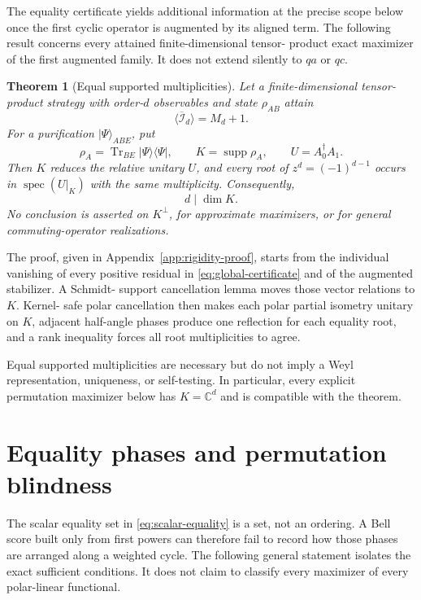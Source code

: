 \documentclass[11pt]{article}
\newtheorem{theorem}{Theorem}[section]
\theoremstyle{definition}
\theoremstyle{remark}
\newcommand{\cI}{\mathcal I}
\newcommand{\Tr}{\operatorname{Tr}}
\newcommand{\supp}{\operatorname{supp}}
\newcommand{\spec}{\operatorname{spec}}
\newcommand{\bbC}{\mathbb C}
\begin{document}
The equality certificate yields additional information at the precise scope
below once the first cyclic operator is augmented by its aligned term.
The following result concerns every attained finite-dimensional tensor-
product exact maximizer of the first augmented family.  It does not extend
silently to \(qa\) or \(qc\).

\begin{theorem}[Equal supported multiplicities]
\label{thm:support-rigidity}
Let a finite-dimensional tensor-product strategy with order-\(d\)
observables and state \(\rho_{AB}\) attain
\[
 \langle\overline{\cI}_d\rangle=M_d+1.
\]
For a purification \(\lvert\Psi\rangle_{ABE}\), put
\[
 \rho_A=\Tr_{BE}\lvert\Psi\rangle\!\langle\Psi\rvert,
 \qquad K=\supp\rho_A,
 \qquad U=A_0^\dagger A_1.
\]
Then \(K\) reduces the relative unitary \(U\), and every root of
\(z^d=(-1)^{d-1}\) occurs in \(\spec(U|_K)\) with the same multiplicity.
Consequently,
\[
 d\mid\dim K.
\]
No conclusion is asserted on \(K^\perp\), for approximate maximizers, or
for general commuting-operator realizations.
\end{theorem}

The proof, given in Appendix~\ref{app:rigidity-proof}, starts from the
individual vanishing of every positive residual in
\eqref{eq:global-certificate} and of the augmented stabilizer.  A Schmidt-
support cancellation lemma moves those vector relations to \(K\).  Kernel-
safe polar cancellation then makes each polar partial isometry unitary on
\(K\), adjacent half-angle phases produce one reflection for each equality
root, and a rank inequality forces all root multiplicities to agree.

Equal supported multiplicities are necessary but do not imply a Weyl
representation, uniqueness, or self-testing.  In particular, every explicit
permutation maximizer below has \(K=\bbC^d\) and is compatible with the
theorem.

\section{Equality phases and permutation blindness}
\label{sec:phase}

The scalar equality set in \eqref{eq:scalar-equality} is a set, not an
ordering.  A Bell score built only from first powers can therefore fail to
record how those phases are arranged along a weighted cycle.  The following
general statement isolates the exact sufficient conditions.  It does not
claim to classify every maximizer of every polar-linear functional.
\end{document}
